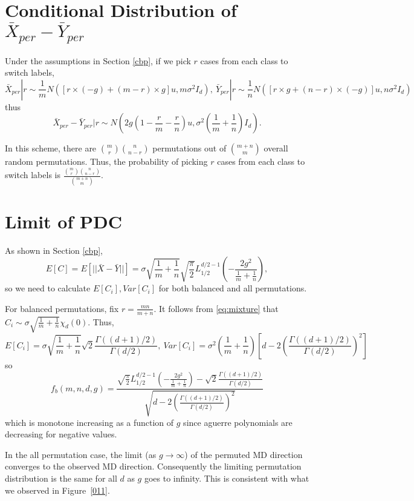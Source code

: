 \documentclass[12pt]{article}
\begin{document}
\begin{appendices}
\section{Conditional Distribution of  $\bar X_{per}- \bar Y_{per}$}
\label{a_condition}
Under the assumptions in Section \ref{cbp}, if we pick $r$ cases from each class to switch labels, 
\[\bar X_{per}|r\sim \frac{1}{m}N([r\times(-g)+(m-r)\times g]u, m\sigma^2I_d),\  \bar Y_{per}|r\sim \frac{1}{n}N([r\times g+(n-r)\times (-g)]u, n\sigma^2I_d) \]
thus
$$\bar X_{per}- \bar Y_{per}|r\sim N(2g(1-\frac{r}{m}-\frac{r}{n})u, \sigma^2(\frac{1}{m}+\frac{1}{n})I_d).$$

In this scheme, there are ${m\choose r} {n\choose n-r}$ permutations out of ${m+n\choose m}$ overall random permutations. Thus, the probability of picking $r$ cases from each class to switch labels is $\frac{{m\choose r} {n\choose n-r}}{{m+n\choose m}}$.

\section{Limit of PDC}
\label{ap:limit}
As shown in Section \ref{cbp}, $$E[C]=E[||\bar X-\bar Y||]=\sigma\sqrt{\frac{1}{m}+\frac{1}{n}}\sqrt{\frac{\pi}{2}}L_{1/2}^{d/2-1}(-\frac{2g^2}{\frac{1}{m}+\frac{1}{n}}),$$ so we need to calculate $E[C_i], Var[C_i]$ for both balanced and all permutations.

For balanced permutations, fix $r=\frac{mn}{m+n}$. It follows from \eqref{eq:mixture} that $C_i\sim \sigma\sqrt{\frac{1}{m}+\frac{1}{n}}\chi_d(0)$. Thus, 
\[
E[C_i]=\sigma\sqrt{\frac{1}{m}+\frac{1}{n}}\sqrt{2}\frac{\Gamma((d+1)/2)}{\Gamma(d/2)}, \ Var[C_i]=\sigma^2(\frac{1}{m}+\frac{1}{n})[d-2(\frac{\Gamma((d+1)/2)}{\Gamma(d/2)})^2]
\]
so 
\[f_b(m, n, d, g)=\frac{\sqrt{\frac{\pi}{2}}L_{1/2}^{d/2-1}(-\frac{2g^2}{\frac{1}{m}+\frac{1}{n}})-\sqrt{2}\frac{\Gamma((d+1)/2)}{\Gamma(d/2)}}{\sqrt{d-2(\frac{\Gamma((d+1)/2)}{\Gamma(d/2)})^2}}
\]
which is monotone increasing as a function of $g$ since aguerre polynomials are decreasing for negative values.

In the all permutation case, the limit (as $g\to \infty$) of the permuted MD direction converges to the observed MD direction. Consequently the limiting permutation distribution is the same for all $d$ as $g$ goes to infinity. This is consistent with what we observed in Figure~\ref{011}. 


\end{appendices}
\end{document}
